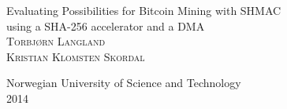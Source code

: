 \documentclass[a4paper]{report}
\begin{document}
\begin{titlepage}
	\begin{center}
		{\huge Evaluating Possibilities for Bitcoin Mining with SHMAC}\\[0.5cm]
		{\large using a SHA-256 accelerator and a DMA}\\[3.5cm]

		\textsc{Torbjørn Langland}\\
		\textsc{Kristian Klomsten Skordal}

		\vfill
		{\large Norwegian University of Science and Technology}\\[0.2em]
		{2014}
	\end{center}
\end{titlepage}



\tableofcontents


%









\end{document}
